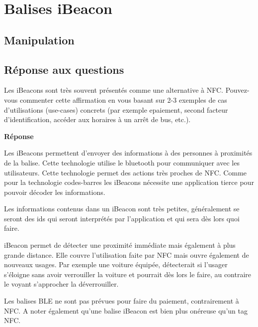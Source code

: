 \documentclass[francais,12pt]{article}
\begin{document}
	\section*{Balises iBeacon}
	\subsection*{Manipulation}
	\subsection*{Réponse aux questions}
	Les iBeacons sont très souvent présentés comme une alternative à NFC. Pouvez-vous commenter cette affirmation en vous basant sur 2-3 exemples de cas d’utilisations (use-cases) concrets (par exemple epaiement, second facteur d’identification, accéder aux horaires à un arrêt de bus, etc.). 

	{\color[rgb]{0,0.5,0.23}\textbf{Réponse}}
	
	Les iBeacons permettent d'envoyer des informations à des personnes à proximités de la balise. Cette technologie utilise le bluetooth pour communiquer avec les utilisateurs. Cette technologie permet des actions très proches de NFC. Comme pour la technologie codes-barres les iBeacons nécessite une application tierce pour pouvoir décoder les informations.
	
	Les informations contenus dans un iBeacon sont très petites, généralement se seront des ids qui seront interprétés par l'application et qui sera dès lors quoi faire.
	
	iBeacon permet de détecter une proximité immédiate mais également à plus grande distance. Elle couvre l'utilisation faite par NFC mais ouvre également de nouveaux usages. Par exemple une voiture équipée, détecterait si l'usager s'éloigne sans avoir verrouiller la voiture et pourrait dès lors le faire, au contraire le voyant s'approcher la déverrouiller.
	
	Les balises BLE ne sont pas prévues pour faire du paiement, contrairement à NFC. A noter également qu'une balise iBeacon est bien plus onéreuse qu'un tag NFC.
	
\end{document}

